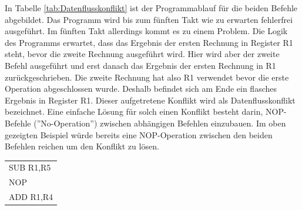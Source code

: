 \documentclass[12pt]{article}
\begin{document}
\noindent In Tabelle \ref{tab:Datenflusskonflikt} ist der Programmablauf für die beiden Befehle abgebildet. Das Programm wird bis zum fünften Takt wie zu erwarten fehlerfrei ausgeführt. Im fünften Takt allerdings kommt es zu einem Problem. Die Logik des Programms erwartet, dass das Ergebnis der ersten Rechnung in Register R1 steht, bevor die zweite Rechnung ausgeführt wird. Hier wird aber der zweite Befehl ausgeführt und erst danach das Ergebnis der ersten Rechnung in R1 zurückgeschrieben. Die zweite Rechnung hat also R1 verwendet bevor die erste Operation abgeschlossen wurde. Deshalb befindet sich am Ende ein flasches Ergebnis in Register R1. Dieser aufgetretene Konflikt wird als Datenflusskonflikt bezeichnet. Eine einfache Lösung für solch einen Konflikt besteht darin, NOP-Befehle (''No-Operation'') zwischen abhängigen Befehlen einzubauen. Im oben gezeigten Beispiel würde bereits eine NOP-Operation zwischen den beiden Befehlen reichen um den Konflikt zu lösen.


\begin{table}[!htb]
\centering
\begin{tabular}{l}
SUB R1,R5 \\
NOP       \\
ADD R1,R4
\end{tabular}
\end{table}
\end{document}
